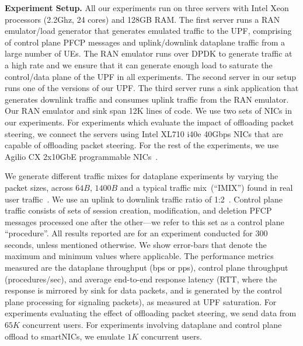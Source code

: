 \noindent \textbf{Experiment Setup.} All our experiments run on three servers with Intel Xeon processors (2.2Ghz, 24 cores) and 128GB RAM. The first server runs a RAN emulator/load generator that generates emulated traffic to the UPF, comprising of control plane PFCP messages and uplink/downlink dataplane traffic from a large number of UEs. The RAN emulator runs over DPDK to generate traffic at a high rate and we ensure that it can generate enough load to saturate the control/data plane of the UPF in all experiments. The second server in our setup runs one of the versions of our UPF. The third server runs a sink application that generates downlink traffic and consumes uplink traffic from the RAN emulator. Our RAN emulator and sink span 12K lines of code. We use two sets of NICs in our experiments. For experiments which evaluate the impact of offloading packet steering, we connect the servers using Intel XL710 i40e 40Gbps NICs that are capable of offloading packet steering. For the rest of the experiments, we use Agilio CX 2x10GbE programmable NICs~\cite{netronome}. 

We generate different traffic mixes for dataplane experiments by varying the packet sizes, across $64B$, $1400B$ and a typical traffic mix~(``IMIX'') found in real user traffic~\cite{imixLink}. We use an uplink to downlink traffic ratio of 1:2~\cite{4g-uldl, 5g-uldl}. 
Control plane traffic consists of sets of session creation, modification, and deletion PFCP messages processed one after the other---we refer to this set as a control plane ``procedure''. All results reported are for an experiment conducted for 300 seconds, unless mentioned otherwise. We show error-bars that denote the maximum and minimum values where applicable. The performance metrics measured are the dataplane throughput (bps or pps), control plane throughput (procedures/sec), and average end-to-end response latency (RTT, where the response is mirrored by sink for data packets, and is generated by the control plane processing for signaling packets), as measured at UPF saturation. For experiments evaluating the effect of offloading packet steering, we send data from $65K$ concurrent users. For experiments involving dataplane and control plane offload to smartNICs, we emulate $1K$ concurrent users.

